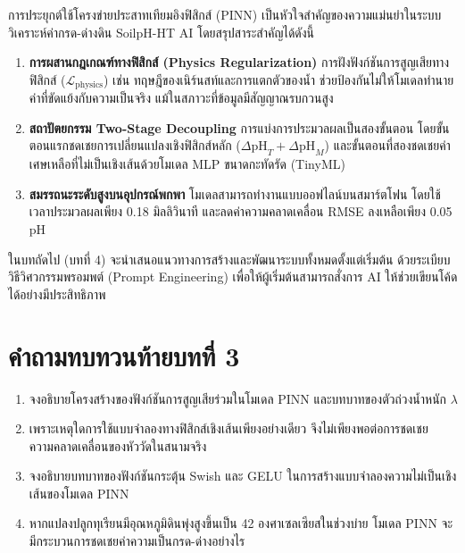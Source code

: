 การประยุกต์ใช้โครงข่ายประสาทเทียมอิงฟิสิกส์ (PINN) เป็นหัวใจสำคัญของความแม่นยำในระบบวิเคราะห์ค่ากรด-ด่างดิน SoilpH-HT AI โดยสรุปสาระสำคัญได้ดังนี้
\begin{enumerate}
    \item \textbf{การผสานกฎเกณฑ์ทางฟิสิกส์ (Physics Regularization)} การฝังฟังก์ชันการสูญเสียทางฟิสิกส์ ($\mathcal{L}_{\text{physics}}$) เช่น ทฤษฎีของเนิร์นสท์และการแตกตัวของน้ำ ช่วยป้องกันไม่ให้โมเดลทำนายค่าที่ขัดแย้งกับความเป็นจริง แม้ในสภาวะที่ข้อมูลมีสัญญาณรบกวนสูง
    \item \textbf{สถาปัตยกรรม Two-Stage Decoupling} การแบ่งการประมวลผลเป็นสองขั้นตอน โดยขั้นตอนแรกชดเชยการเปลี่ยนแปลงเชิงฟิสิกส์หลัก ($\Delta\text{pH}_T + \Delta\text{pH}_M$) และขั้นตอนที่สองชดเชยค่าเศษเหลือที่ไม่เป็นเชิงเส้นด้วยโมเดล MLP ขนาดกะทัดรัด (TinyML)
    \item \textbf{สมรรถนะระดับสูงบนอุปกรณ์พกพา} โมเดลสามารถทำงานแบบออฟไลน์บนสมาร์ตโฟน โดยใช้เวลาประมวลผลเพียง 0.18 มิลลิวินาที และลดค่าความคลาดเคลื่อน RMSE ลงเหลือเพียง 0.05 pH
\end{enumerate}

ในบทถัดไป (บทที่ 4) จะนำเสนอแนวทางการสร้างและพัฒนาระบบทั้งหมดตั้งแต่เริ่มต้น ด้วยระเบียบวิธีวิศวกรรมพรอมพต์ (Prompt Engineering) เพื่อให้ผู้เริ่มต้นสามารถสั่งการ AI ให้ช่วยเขียนโค้ดได้อย่างมีประสิทธิภาพ

\section*{คำถามทบทวนท้ายบทที่ 3}

\begin{enumerate}
    \item จงอธิบายโครงสร้างของฟังก์ชันการสูญเสียร่วมในโมเดล PINN และบทบาทของตัวถ่วงน้ำหนัก $\lambda$
    \item เพราะเหตุใดการใช้แบบจำลองทางฟิสิกส์เชิงเส้นเพียงอย่างเดียว จึงไม่เพียงพอต่อการชดเชยความคลาดเคลื่อนของหัววัดในสนามจริง
    \item จงอธิบายบทบาทของฟังก์ชันกระตุ้น Swish และ GELU ในการสร้างแบบจำลองความไม่เป็นเชิงเส้นของโมเดล PINN
    \item หากแปลงปลูกทุเรียนมีอุณหภูมิดินพุ่งสูงขึ้นเป็น 42 องศาเซลเซียสในช่วงบ่าย โมเดล PINN จะมีกระบวนการชดเชยค่าความเป็นกรด-ด่างอย่างไร
\end{enumerate}
